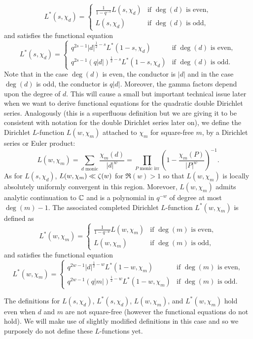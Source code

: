 \documentclass[12pt,reqno,oneside]{amsart}
\begin{document}
    \[
        L^{\ast}(s,\chi_{d}) = \begin{cases} \frac{1}{1-q^{-s}}L(s,\chi_{d}) & \text{if $\deg(d)$ is even}, \\ L(s,\chi_{d}) & \text{if $\deg(d)$ is odd}, \end{cases}
    \]
    and satisfies the functional equation
    \[
        L^{\ast}(s,\chi_{d}) = \begin{cases} q^{2s-1}|d|^{\frac{1}{2}-s}L^{\ast}(1-s,\chi_{d}) & \text{if $\deg(d)$ is even}, \\ q^{2s-1}(q|d|)^{\frac{1}{2}-s}L^{\ast}(1-s,\chi_{d}) & \text{if $\deg(d)$ is odd}. \end{cases}
    \]
    Note that in the case $\deg(d)$ is even, the conductor is $|d|$ and in the case $\deg(d)$ is odd, the conductor is $q|d|$. Moreover, the gamma factors depend upon the degree of $d$. This will cause a small but important technical issue later when we want to derive functional equations for the quadratic double Dirichlet series. Analogously (this is a superfluous definition but we are giving it to be consistent with notation for the double Dirichlet series later on), we define the Dirichlet $L$-function $L(w,\chi_{m})$ attached to $\chi_{m}$ for square-free $m$, by a Dirichlet series or Euler product:
    \[
        L(w,\chi_{m}) = \sum_{\text{$d$ monic}}\frac{\chi_{m}(d)}{|d|^{w}} = \prod_{\text{$P$ monic irr}}\left(1-\frac{\chi_{m}(P)}{|P|^{w}}\right)^{-1}.
    \]
    As for $L(s,\chi_{d})$, $L(w,\chi_{m}) \ll \zeta(w)$ for $\Re(w) > 1$ so that $L(w,\chi_{m})$ is locally absolutely uniformly convergent in this region. Morevoer, $L(w,\chi_{m})$ admits analytic continuation to $\mathbb{C}$ and is a polynomial in $q^{-w}$ of degree at most $\deg(m)-1$. The associated completed Dirichlet $L$-function $L^{\ast}(w,\chi_{m})$ is defined as
    \[
        L^{\ast}(w,\chi_{m}) = \begin{cases} \frac{1}{1-q^{-w}}L(w,\chi_{m}) & \text{if $\deg(m)$ is even}, \\ L(w,\chi_{m}) & \text{if $\deg(m)$ is odd}, \end{cases}
    \]
    and satisfies the functional equation
    \[
        L^{\ast}(w,\chi_{m}) = \begin{cases} q^{2w-1}|d|^{\frac{1}{2}-w}L^{\ast}(1-w,\chi_{m}) & \text{if $\deg(m)$ is even}, \\ q^{2w-1}(q|m|)^{\frac{1}{2}-w}L^{\ast}(1-w,\chi_{m}) & \text{if $\deg(m)$ is odd}. \end{cases}
    \]

    \begin{remark}
        The definitions for $L(s,\chi_{d})$, $L^{\ast}(s,\chi_{d})$, $L(w,\chi_{m})$, and $L^{\ast}(w,\chi_{m})$ hold even when $d$ and $m$ are not square-free (however the functional equations do not hold). We will make use of slightly modified definitions in this case and so we purposely do not define these $L$-functions yet.
    \end{remark}
\end{document}
